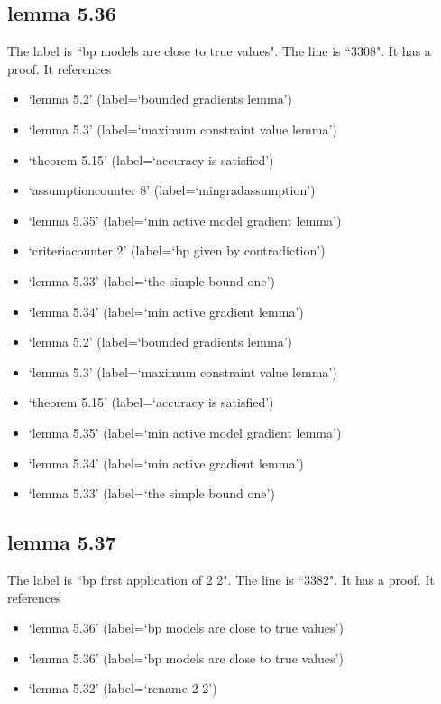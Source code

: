 \documentclass{article}
\begin{document}
\subsection{lemma 5.36}
The label is ``bp models are close to true values".
The line is ``3308".
It has a proof.
It references \begin{itemize}
\item `lemma 5.2' (label=`bounded gradients lemma')
\item `lemma 5.3' (label=`maximum constraint value lemma')
\item `theorem 5.15' (label=`accuracy is satisfied')
\item `assumptioncounter 8' (label=`mingradassumption')
\item `lemma 5.35' (label=`min active model gradient lemma')
\item `criteriacounter 2' (label=`bp given by contradiction')
\item `lemma 5.33' (label=`the simple bound one')
\item `lemma 5.34' (label=`min active gradient lemma')
\item `lemma 5.2' (label=`bounded gradients lemma')
\item `lemma 5.3' (label=`maximum constraint value lemma')
\item `theorem 5.15' (label=`accuracy is satisfied')
\item `lemma 5.35' (label=`min active model gradient lemma')
\item `lemma 5.34' (label=`min active gradient lemma')
\item `lemma 5.33' (label=`the simple bound one')
\end{itemize}
\subsection{lemma 5.37}
The label is ``bp first application of 2 2".
The line is ``3382".
It has a proof.
It references \begin{itemize}
\item `lemma 5.36' (label=`bp models are close to true values')
\item `lemma 5.36' (label=`bp models are close to true values')
\item `lemma 5.32' (label=`rename 2 2')
\end{itemize}
\end{document}
